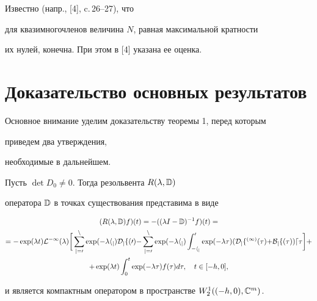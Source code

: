  


\begin{notenonum} 


Известно (напр., [4], c.\,26--27), что 


для квазимногочленов величина $N$, равная максимальной кратности 


их нулей, конечна. При этом в [4] указана ее оценка. 


\end{notenonum} 


 


\section{Доказательство основных результатов} 


 


Основное внимание уделим доказательству теоремы 1, перед которым 


приведем два утверждения, 


необходимые в дальнейшем. 


 


\begin{prop} 


Пусть $\det D_0\ne0$. Тогда резольвента $R(\lambda,\Bbb D)$ 


оператора $\Bbb D$ в точках существования представима в виде 


\begin{multline} 


(R(\lambda,\Bbb D)f)(t)=-((\lambda I-\Bbb D)^{-1}f)(t)= \\ 


% 


={-}\exp(\lambda t)\cal L^{-1}(\lambda)\bigg[\sum^n_{j=0}\exp 


({-}\lambda h_j)D_j f(0){-}\sum^n_{j=0} 


\exp({-}\lambda h_j)\int^0_{-h_j}\exp({-}\lambda\tau) 


(D_j f^{(1)}(\tau){+}B_j f(\tau))d\tau\bigg]+\\ 


% 


+\exp(\lambda t)\int^t_0\exp(-\lambda\tau) 


f(\tau)d\tau,\quad t\in[-h,0], 


\end{multline} 


и является компактным оператором в пространстве $W^1_2((-h,0),\Bbb 


C^m)$. 


\end{prop} 


